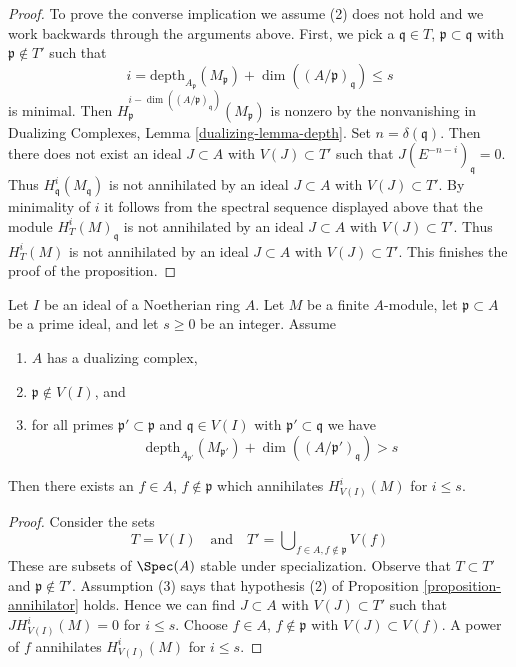 \begin{proof}
\medskip\noindent
To prove the converse implication we assume (2) does not hold
and we work backwards through the arguments above. First, we pick a
$\mathfrak q \in T$, $\mathfrak p \subset \mathfrak q$
with $\mathfrak p \not \in T'$ such that
$$
i = \text{depth}_{A_\mathfrak p}(M_\mathfrak p) +
\dim((A/\mathfrak p)_\mathfrak q) \leq s
$$
is minimal. Then
$H^{i - \dim((A/\mathfrak p)_\mathfrak q)}_\mathfrak p(M_\mathfrak p)$
is nonzero by the nonvanishing in
Dualizing Complexes, Lemma \ref{dualizing-lemma-depth}.
Set $n = \delta(\mathfrak q)$. Then
there does not exist an ideal $J \subset A$ with $V(J) \subset T'$
such that $J(E^{-n - i})_\mathfrak q = 0$.
Thus $H^i_\mathfrak q(M_\mathfrak q)$ is not
annihilated by an ideal $J \subset A$ with $V(J) \subset T'$.
By minimality of $i$ it follows from the spectral sequence displayed above
that the module $H^i_T(M)_\mathfrak q$
is not annihilated by an ideal $J \subset A$
with $V(J) \subset T'$. Thus $H^i_T(M)$
is not annihilated by an ideal $J \subset A$
with $V(J) \subset T'$. This finishes the proof of the proposition.
\end{proof}

\begin{lemma}
\label{lemma-kill-local-cohomology-at-prime}
Let $I$ be an ideal of a Noetherian ring $A$.
Let $M$ be a finite $A$-module, let $\mathfrak p \subset A$ be a prime
ideal, and let $s \geq 0$ be an integer. Assume
\begin{enumerate}
\item $A$ has a dualizing complex,
\item $\mathfrak p \not \in V(I)$, and
\item for all primes $\mathfrak p' \subset \mathfrak p$
and $\mathfrak q \in V(I)$ with $\mathfrak p' \subset \mathfrak q$ we have
$$
\text{depth}_{A_{\mathfrak p'}}(M_{\mathfrak p'}) +
\dim((A/\mathfrak p')_\mathfrak q) > s
$$
\end{enumerate}
Then there exists an $f \in A$, $f \not \in \mathfrak p$ which annihilates
$H^i_{V(I)}(M)$ for $i \leq s$.
\end{lemma}

\begin{proof}
Consider the sets
$$
T = V(I)
\quad\text{and}\quad
T' = \bigcup\nolimits_{f \in A, f \not \in \mathfrak p} V(f)
$$
These are subsets of $\Spec(A)$ stable under specialization.
Observe that $T \subset T'$ and $\mathfrak p \not \in T'$.
Assumption (3) says that hypothesis (2) of
Proposition \ref{proposition-annihilator} holds.
Hence we can find $J \subset A$ with $V(J) \subset T'$
such that $J H^i_{V(I)}(M) = 0$ for $i \leq s$.
Choose $f \in A$, $f \not \in \mathfrak p$ with $V(J) \subset V(f)$.
A power of $f$ annihilates $H^i_{V(I)}(M)$ for $i \leq s$.
\end{proof}






